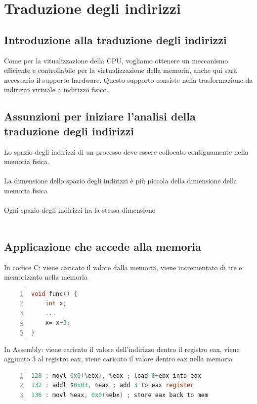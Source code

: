 \documentclass{article}
\begin{document}
\section{Traduzione degli indirizzi}
\subsection{Introduzione alla traduzione degli indirizzi}
Come per la vitualizzazione della CPU, vogliamo ottenere un meccanismo efficiente e controllabile per la virtualizzazione della memoria, anche qui sarà necessario il supporto hardware. Questo supporto consiste nella trasformazione da indirizzo virtuale a indirizzo fisico. 
\subsection{Assunzioni per iniziare l'analisi della traduzione degli indirizzi}
Lo spazio degli indirizzi di un processo deve essere collocato contiguamente nella memoria fisica.\\\\
La dimensione dello spazio degli indirizzi è più piccola della dimensione della memoria fisica\\\\
Ogni spazio degli indirizzi ha la stessa dimensione\\\\
\subsection{Applicazione che accede alla memoria}
In codice C: viene caricato il valore dalla memoria, viene incrementato di tre e memorizzato nella memoria
\begin{lstlisting}[language=C, frame=single, numbers=left]
void func() {
    int x;
    ...
    x= x+3; 
}
\end{lstlisting}
\noindent
In Assembly: viene caricato il valore dell'indirizzo dentro il registro eax, viene aggiunto 3 al registro eax, viene caricato il valore dentro eax nella memoria
\begin{lstlisting}[language=C, frame=single, numbers=left]
128 : movl 0x0(%ebx), %eax ; load 0+ebx into eax
132 : addl $0x03, %eax ; add 3 to eax register
136 : movl %eax, 0x0(%ebx) ; store eax back to mem
\end{lstlisting}
\end{document}
